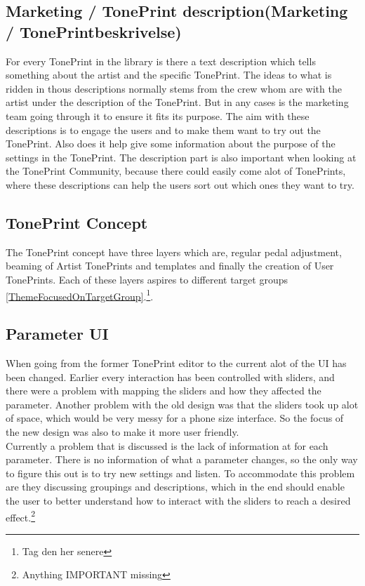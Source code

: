 \subsection*{Marketing / TonePrint description(Marketing / TonePrintbeskrivelse)} 
\label{ThemeMarketingTonePrintDescription}
For every TonePrint in the library is there a text description which tells something about the artist and the specific TonePrint. The ideas to what is ridden in thous descriptions normally stems from the crew whom are with the artist under the description of the TonePrint. But in any cases is the marketing team going through it to ensure it fits its purpose. The aim with these descriptions is to engage the users and to make them want to try out the TonePrint. Also does it help give some information about the purpose of the settings in the TonePrint. The description part is also important when looking at the TonePrint Community, because there could easily come alot of TonePrints, where these descriptions can help the users sort out which ones they want to try. 

\subsection*{TonePrint Concept}
\label{ThemeTonePrintConcept}
The TonePrint concept have three layers which are, regular pedal adjustment, beaming of Artist TonePrints and templates and finally the creation of User TonePrints. Each of these layers aspires to different target groups \autoref{ThemeFocusedOnTargetGroup}.\footnote{Tag den her senere}.

\subsection*{Parameter UI}
\label{ThemeParameterUI}
When going from the former TonePrint editor to the current alot of the UI has been changed. Earlier every interaction has been controlled with sliders, and there were a problem with mapping the sliders and how they affected the parameter. Another problem with the old design was that the sliders took up alot of space, which would be very messy for a phone size interface. So the focus of the new design was also to make it more user friendly.\\
Currently a problem that is discussed is the lack of information at for each parameter. There is no information of what a parameter changes, so the only way to figure this out is to try new settings and listen. To accommodate this problem are they discussing groupings and descriptions, which in the end should enable the user to better understand how to interact with the sliders to reach a desired effect.\footnote{Anything IMPORTANT missing}


